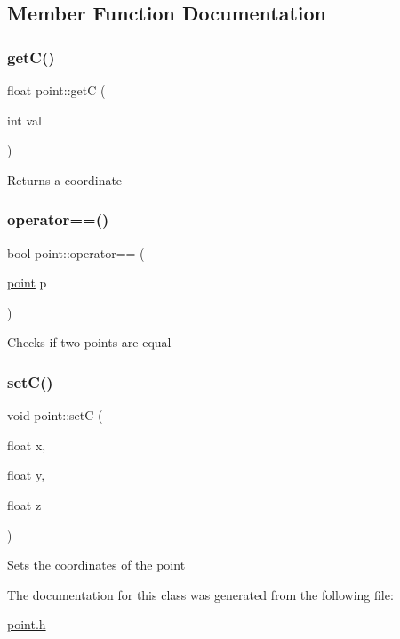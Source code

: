 \subsection{Member Function Documentation}
\mbox{\label{classpoint_a042a11308d5c1d7e7605b30d8505fc97}} 
\subsubsection{\texorpdfstring{get\+C()}{getC()}}
{\footnotesize\ttfamily float point\+::getC (\begin{DoxyParamCaption}\item[{int}]{val }\end{DoxyParamCaption})\hspace{0.3cm}{\ttfamily [inline]}}

Returns a coordinate \mbox{\label{classpoint_a1b726e5c7b1c25647d685fe48d9a6e39}} 
\subsubsection{\texorpdfstring{operator==()}{operator==()}}
{\footnotesize\ttfamily bool point\+::operator== (\begin{DoxyParamCaption}\item[{\hyperlink{classpoint}{point}}]{p }\end{DoxyParamCaption})\hspace{0.3cm}{\ttfamily [inline]}}

Checks if two points are equal \mbox{\label{classpoint_ae40877ee3ed7560a4b58a681f68bdc2e}} 
\subsubsection{\texorpdfstring{set\+C()}{setC()}}
{\footnotesize\ttfamily void point\+::setC (\begin{DoxyParamCaption}\item[{float}]{x,  }\item[{float}]{y,  }\item[{float}]{z }\end{DoxyParamCaption})\hspace{0.3cm}{\ttfamily [inline]}}

Sets the coordinates of the point 

The documentation for this class was generated from the following file\+:\begin{DoxyCompactItemize}
\item 
\hyperlink{point_8h}{point.\+h}\end{DoxyCompactItemize}

